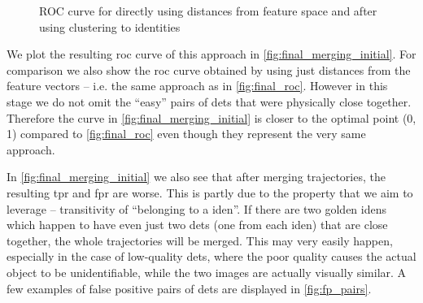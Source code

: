 \begin{figure}
    \centering
    \def\svgwidth{\columnwidth}
    {}
    \caption{ROC curve for directly using distances from feature space and after using clustering to identities}
    \label{fig:final_merging_initial}
\end{figure}

We plot the resulting \gls{roc} curve of this approach in \autoref{fig:final_merging_initial}. For comparison we also show the \gls{roc} curve obtained by using just distances from the feature vectors -- i.e. the same approach as in  \autoref{fig:final_roc}. However in this stage we do not omit the ``easy'' pairs of \glspl{det} that were physically close together. Therefore the curve in \autoref{fig:final_merging_initial} is closer to the optimal point (0, 1) compared to \autoref{fig:final_roc} even though they represent the very same approach.

In \autoref{fig:final_merging_initial} we also see that after merging trajectories, the resulting \gls{tpr} and \gls{fpr} are worse. This is partly due to the property that we aim to leverage -- transitivity of ``belonging to a \gls{iden}''. If there are two golden \glspl{iden} which happen to have even just two \glspl{det} (one from each \gls{iden}) that are close together, the whole trajectories will be merged. This may very easily happen, especially in the case of low-quality \glspl{det}, where the poor quality causes the actual object to be unidentifiable, while the two images are actually visually similar. A few examples of false positive pairs of \glspl{det} are displayed in \autoref{fig:fp_pairs}.

